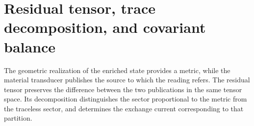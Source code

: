 

%

\chapter{Residual tensor, trace decomposition, and covariant balance}
\label{x_reciprocidad:vii:sec:tensor-residual-balance}

The geometric realization of the enriched state provides a metric,
while the material transducer publishes the source to which the
reading refers. The residual tensor preserves the difference between the two publications
in the same tensor space. Its decomposition distinguishes the
sector proportional to the metric from the traceless sector, and determines
the exchange current corresponding to that partition.

